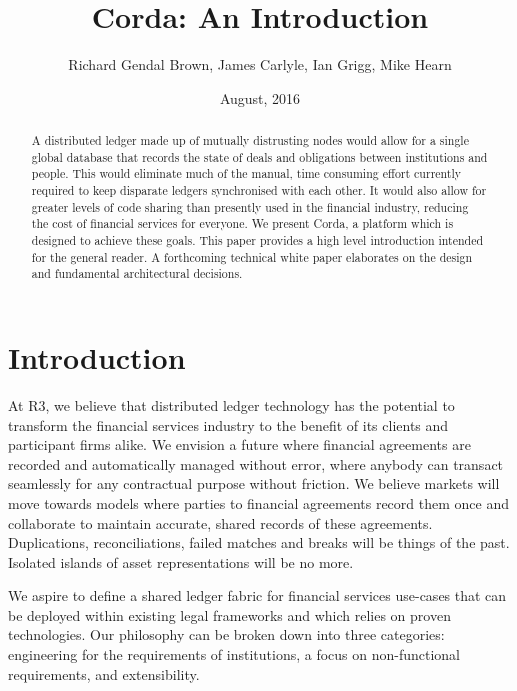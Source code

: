 \documentclass{article}
\author{Richard Gendal Brown, James Carlyle, Ian Grigg, Mike Hearn}
\date{August, 2016}
\title{Corda: An Introduction}
\begin{document}
\maketitle 



\begin{abstract}

A distributed ledger made up of mutually distrusting nodes would allow for a single global database that records the state of deals and obligations between institutions and people. This would eliminate much of the manual, time consuming effort currently required to keep disparate ledgers synchronised with each other. It would also allow for greater levels of code sharing than presently used in the financial industry, reducing the cost of financial services for everyone. We present Corda, a platform which is designed to achieve these goals. This paper provides a high level introduction intended for the general reader. A forthcoming technical white paper elaborates on the design and fundamental architectural decisions.
\end{abstract}
\newpage
\tableofcontents
\newpage
\section{Introduction}
At R3, we believe that distributed ledger technology has the potential to transform the financial services industry to the benefit of its clients and participant firms alike. We envision a future where financial agreements are recorded and automatically managed without error, where anybody can transact seamlessly for any contractual purpose without friction. We believe markets will move towards models where parties to financial agreements record them once and collaborate to maintain accurate, shared records of these agreements. Duplications, reconciliations, failed matches and breaks will be things of the past. Isolated islands of asset representations will be no more.

We aspire to define a shared ledger fabric for financial services use-cases that can be deployed within existing legal frameworks and which relies on proven technologies. Our philosophy can be broken down into three categories: engineering for the requirements of institutions, a focus on non-functional requirements, and extensibility.
\end{document}
